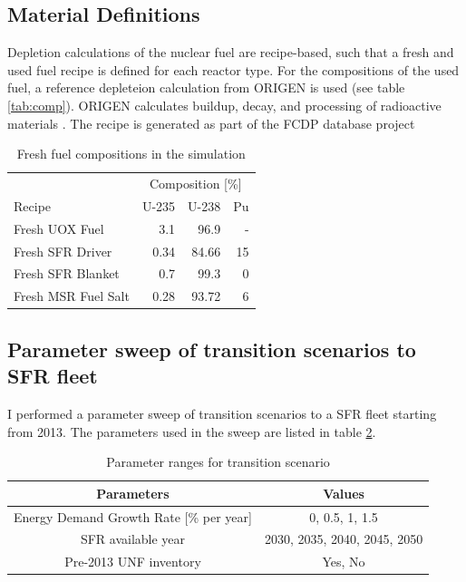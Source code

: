 \subsection{Material Definitions}
Depletion calculations of the nuclear fuel are recipe-based, such that a 
fresh and used fuel recipe is defined for each reactor type. For the compositions
of the used fuel, a reference depleteion calculation from ORIGEN is used (see
table \ref{tab:comp}). ORIGEN calculates buildup, decay, and processing of 
radioactive materials \cite{parks_overview_1992}. The recipe is generated as
part of the FCDP database project %

\begin{table}[h]
    \centering
    \caption{Fresh fuel compositions in the simulation} %
        \begin{tabular}{lrrr}
            \hline
             & \multicolumn{3}{c}{ Composition [\%]} \\
            Recipe & U-235  & U-238  & Pu \\ 
            \hline
            Fresh \gls{UOX} Fuel & 3.1 & 96.9 & -   \\ 
            Fresh \gls{SFR} Driver & 0.34 & 84.66 & 15 \\ 
            Fresh \gls{SFR} Blanket & 0.7 & 99.3 & 0 \\
            Fresh \gls{MSR} Fuel Salt & 0.28 & 93.72 & 6 \\
            \hline
        \end{tabular}
        \label{tab:sim_result}
\end {table}


\subsection{Parameter sweep of transition scenarios to \gls{SFR} fleet}
I performed a parameter sweep of transition scenarios to
a \gls{SFR} fleet starting from 2013. The parameters used in the
sweep are listed in table \ref{tab:params}.

\begin{table}[h]
    \centering
    \begin{tabular}{cc}
        \hline
        Parameters & Values \\
        \hline
        Energy Demand Growth Rate [\% per year] & 0, 0.5, 1, 1.5 \\
        \gls{SFR} available year & 2030, 2035, 2040, 2045, 2050\\
        Pre-2013 \gls{UNF} inventory & Yes, No \\
        \hline
    \end{tabular}
    \caption{Parameter ranges for transition scenario}
    \label{tab:params}
\end{table}


